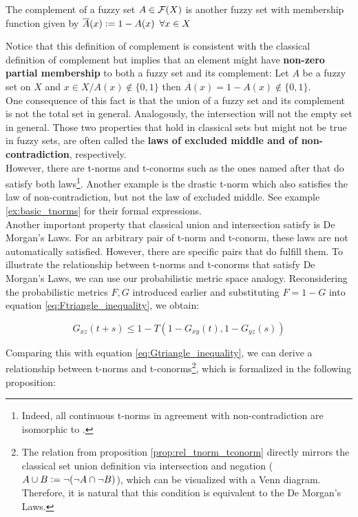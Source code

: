 \begin{definition}[Complement]
  The complement of a fuzzy set $A\in \mathcal{F}(X)$ is another fuzzy set with membership function given by $\overline{A}(x) \coleq 1 - A(x) \forall x\in X$
\end{definition}

Notice that this definition of complement is consistent with the classical definition of complement but implies that an element might have \textbf{non-zero partial membership} to both a fuzzy set and its complement: Let $A$ be a fuzzy set on $X$ and $x \in X / A(x)\notin \{0,1\}$ then $\overline{ A}(x)= 1 - A(x) \notin \{0,1\}$.\\

One consequence of this fact is that the union of a fuzzy set and its complement is not the total set in general. Analogously, the intersection will not the empty set in general. Those two properties that hold in classical sets but might not be true in fuzzy sets, are often called the \textbf{laws of excluded middle and of non-contradiction}, respectively.\\

However, there are t-norms and t-conorms such as the ones named after \luka that do satisfy both laws\footnote{Indeed, all continuous t-norms in agreement with non-contradiction are isomorphic to \luka \cite[p.~7]{LukasiewiczNonContrad}.}. Another example is the drastic t-norm which also satisfies the law of non-contradiction, but not the law of excluded middle. See example \ref{ex:basic_tnorms} for their formal expressions. \\

Another important property that classical union and intersection satisfy is De Morgan's Laws. For an arbitrary pair of t-norm and t-conorm, these laws are not automatically satisfied. However, there are specific pairs that do fulfill them. To illustrate the relationship between t-norms and t-conorms that satisfy De Morgan's Laws, we can use our probabilistic metric space analogy. Reconsidering the probabilistic metrics $F,G$ introduced earlier and substituting $F = 1 - G$ into equation \ref{eq:Ftriangle_inequality}, we obtain:

\[ G_{xz}(t + s) \leq 1 - T(1 - G_{xy}(t), 1 - G_{yz}(s))\]

Comparing this with equation \ref{eq:Gtriangle_inequality}, we can derive a relationship between t-norms and t-conorms\footnote{The relation from proposition \ref{prop:rel_tnorm_tconorm} directly mirrors the classical set union definition via intersection and negation ($A\cup B \mathrel{\mathop:}= \neg (\neg A \cap \neg B)$), which can be visualized with a Venn diagram. Therefore, it is natural that this condition is equivalent to the De Morgan's Laws.}, which is formalized in the following proposition:

